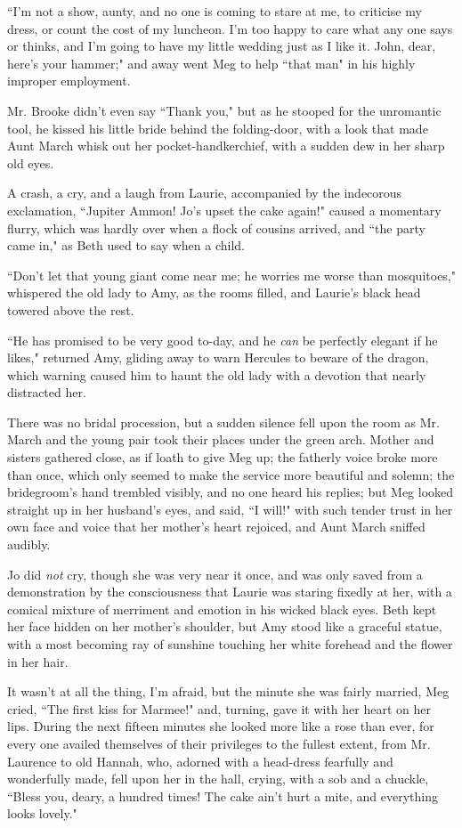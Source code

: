 ``I'm not a show, aunty, and no one is coming to stare at
me, to criticise my dress, or count the cost of my luncheon.
I'm too happy to care what any one says or thinks, and
I'm going to have my little wedding just as I like it.
John, dear, here's your hammer;" and away went Meg to
help ``that man" in his highly improper employment.

Mr. Brooke didn't even say ``Thank you," but as he
stooped for the unromantic tool, he kissed his little bride behind the
folding-door, with a look that made Aunt March whisk out her
pocket-handkerchief, with a sudden dew in her sharp old eyes.

A crash, a cry, and a laugh from Laurie, accompanied by the indecorous
exclamation, ``Jupiter Ammon! Jo's upset the cake again!"
caused a momentary flurry, which was hardly over when a flock of cousins
arrived, and ``the party came in," as Beth used to say when a child.

``Don't let that young giant come near me; he worries me
worse than mosquitoes," whispered the old lady to Amy, as the rooms
filled, and Laurie's black head towered above the rest.

``He has promised to be very good to-day, and he \emph{can} be perfectly
elegant if he likes," returned Amy, gliding away to warn Hercules to
beware of the dragon, which warning caused him to haunt the old lady
with a devotion that nearly distracted her.

There was no bridal procession, but a sudden silence fell upon the room
as Mr. March and the young pair took their places under the green arch.
Mother and sisters gathered close, as if loath to give Meg up; the
fatherly voice broke more than once, which only seemed to make the
service more beautiful and solemn; the bridegroom's hand
trembled visibly, and no one heard his replies; but Meg looked straight
up in her husband's eyes, and said, ``I will!" with such
tender trust in her own face and voice that her mother's
heart rejoiced, and Aunt March sniffed audibly.

Jo did \emph{not} cry, though she was very near it once, and was only
saved from a demonstration by the consciousness that Laurie was staring
fixedly at her, with a comical mixture of merriment and emotion in his
wicked black eyes. Beth kept her face hidden on her
mother's shoulder, but Amy stood like a graceful statue,
with a most becoming ray of sunshine touching her white forehead and the
flower in her hair.

It wasn't at all the thing, I'm afraid,
but the minute she was fairly married, Meg cried, ``The first kiss for
Marmee!" and, turning, gave it with her heart on her lips. During the
next fifteen minutes she looked more like a rose than ever, for every
one availed themselves of their privileges to the fullest extent, from
Mr. Laurence to old Hannah, who, adorned with a head-dress fearfully and
wonderfully made, fell upon her in the hall, crying, with a sob and a
chuckle, ``Bless you, deary, a hundred times! The cake
ain't hurt a mite, and everything looks lovely."

